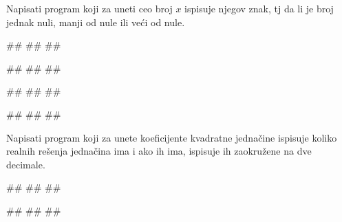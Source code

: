 \begin{Exercise}[label=v1.2_03] 
Napisati program koji za uneti ceo broj $x$ ispisuje njegov znak, tj da li je broj jednak nuli, manji od nule ili veći od nule.

\begin{miditest}
\begin{upotreba}{1}
#\naslovInt#
##
##
\end{upotreba}
\end{miditest}
\begin{miditest}
\begin{upotreba}{2}
#\naslovInt#
##
##
\end{upotreba}
\end{miditest}

\begin{miditest}
\begin{upotreba}{3}
#\naslovInt#
##
##
\end{upotreba}
\end{miditest}
\begin{miditest}
\begin{upotreba}{4}
#\naslovInt#
##
##
\end{upotreba}
\end{miditest}

\end{Exercise}
\begin{Answer}[ref=v1.2_03]
\end{Answer}


\begin{Exercise}[label=v1.2_07] 
Napisati program koji za unete koeficijente kvadratne jednačine ispisuje koliko realnih rešenja jednačina ima i ako ih ima, ispisuje ih zaokružene na dve decimale.

\begin{miditest}
\begin{upotreba}{1}
#\naslovInt#
##
##
\end{upotreba}
\end{miditest}
\begin{miditest}
\begin{upotreba}{2}
#\naslovInt#
##
##
\end{upotreba}
\end{miditest}

\end{Exercise}
\begin{Answer}[ref=v1.2_07]
\end{Answer}

